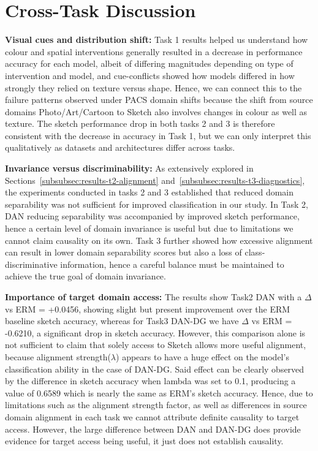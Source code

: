 \documentclass{article}
\begin{document}

\section{Cross-Task Discussion}
\label{sec:discussion}


\textbf{Visual cues and distribution shift:}
Task 1 results helped us understand how colour and spatial interventions generally resulted in a decrease in performance accuracy for each model, albeit of differing magnitudes depending on type of intervention and model, and cue-conflicts showed how models differed in how strongly they relied on texture versus shape. Hence, we can connect this to the failure patterns observed under PACS domain shifts because the shift from source domains Photo/Art/Cartoon to Sketch also involves changes in colour as well as texture. The sketch performance drop in both tasks 2 and 3 is therefore consistent with the decrease in accuracy in Task 1, but we can only interpret this qualitatively as datasets and architectures differ across tasks.

\textbf{Invariance versus discriminability:}
As extensively explored in Sections~\ref{subsubsec:results-t2-alignment} and~\ref{subsubsec:results-t3-diagnostics}, the experiments conducted in tasks 2 and 3 established that reduced domain separability was not sufficient for improved classification in our study. In Task 2, DAN reducing separability was accompanied by improved sketch performance, hence a certain level of domain invariance is useful but due to limitations we cannot claim causality on its own. Task 3 further showed how excessive alignment can result in lower domain separability scores but also a loss of class-discriminative information, hence a careful balance must be maintained to achieve the true goal of domain invariance.

\textbf{Importance of target domain access:} The results show Task2 DAN with a $\Delta$ vs ERM = +0.0456, showing slight but present improvement over the ERM baseline sketch accuracy, whereas for Task3 DAN-DG we have $\Delta$ vs ERM = -0.6210, a significant drop in sketch accuracy. However, this comparison alone is not sufficient to claim that solely access to Sketch allows more useful alignment, because alignment strength($\lambda$) appears to have a huge effect on the model’s classification ability in the case of DAN-DG. Said effect can be clearly observed by the difference in sketch accuracy when lambda was set to 0.1, producing a value of 0.6589 which is nearly the same as ERM’s sketch accuracy. Hence, due to limitations such as the alignment strength factor, as well as differences in source domain alignment in each task we cannot attribute definite causality to target access. However, the large difference between DAN and DAN-DG does provide evidence for target access being useful, it just does not establish causality.
\end{document}

